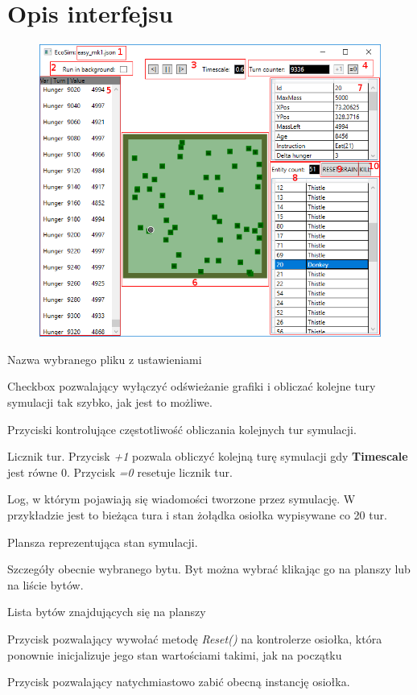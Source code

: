 \section{Opis interfejsu}
\begin{figure}[H]
    \centering
    \includegraphics[scale=0.55]{Chapters/interface_annotated}
    \end{figure}
\begin{interface_descs}
    \item Nazwa wybranego pliku z ustawieniami
    \item Checkbox pozwalający wyłączyć odświeżanie grafiki i obliczać kolejne tury symulacji tak szybko, jak jest to możliwe.
    \item Przyciski kontrolujące częstotliwość obliczania kolejnych tur symulacji.
    \item Licznik tur. Przycisk \textit{+1} pozwala obliczyć kolejną turę symulacji gdy \textbf{Timescale} jest równe 0. Przycisk \textit{=0} resetuje licznik tur.
    \item Log, w którym pojawiają się wiadomości tworzone przez symulację. W przykładzie jest to bieżąca tura i stan żołądka osiołka wypisywane co 20 tur.
    \item Plansza reprezentująca stan symulacji.
    \item Szczegóły obecnie wybranego bytu. Byt można wybrać klikając go na planszy lub na liście bytów.
    \item Lista bytów znajdujących się na planszy
    \item Przycisk pozwalający wywołać metodę \textit{Reset()} na kontrolerze osiołka, która ponownie inicjalizuje jego stan wartościami takimi, jak na początku
    \item Przycisk pozwalający natychmiastowo zabić obecną instancję osiołka.
\end{interface_descs}

